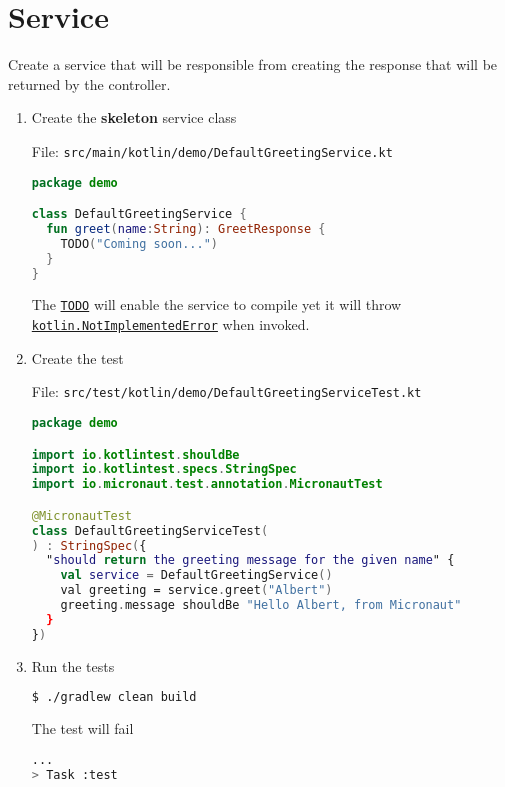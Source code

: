 \section{Service}\label{sec:service}

Create a service that will be responsible from creating the response that will be returned by the controller.

\begin{enumerate}

\item Create the \textbf{skeleton} service class

File: \texttt{src/main/kotlin/demo/DefaultGreetingService.kt}
\begin{lstlisting}[language=Kotlin]
package demo

class DefaultGreetingService {
  fun greet(name:String): GreetResponse {
    TODO("Coming soon...")
  }
}
\end{lstlisting}

The \href{https://kotlinlang.org/api/latest/jvm/stdlib/kotlin/-t-o-d-o.html}{\texttt{TODO}} will enable the service to compile yet it will throw \href{https://kotlinlang.org/api/latest/jvm/stdlib/kotlin/-not-implemented-error/}{\texttt{kotlin.NotImplementedError}} when invoked.

\item Create the test

File: \texttt{src/test/kotlin/demo/DefaultGreetingServiceTest.kt}
\begin{lstlisting}[language=Kotlin]
package demo

import io.kotlintest.shouldBe
import io.kotlintest.specs.StringSpec
import io.micronaut.test.annotation.MicronautTest

@MicronautTest
class DefaultGreetingServiceTest(
) : StringSpec({
  "should return the greeting message for the given name" {
    val service = DefaultGreetingService()
    val greeting = service.greet("Albert")
    greeting.message shouldBe "Hello Albert, from Micronaut"
  }
})
\end{lstlisting}

\item Run the tests

\begin{lstlisting}[language=bash]
$ ./gradlew clean build
\end{lstlisting}

The test will fail

\begin{lstlisting}[language=bash]
...
> Task :test


\end{lstlisting}
\end{enumerate}
